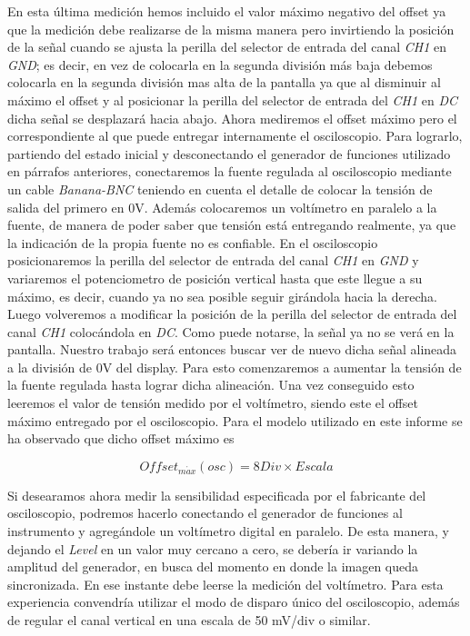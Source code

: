 \documentclass{article}
\begin{document}
\noindent En esta última medición hemos incluido el valor máximo negativo del offset ya que la medición debe realizarse de la misma manera pero invirtiendo la posición de la señal cuando se ajusta la perilla del selector de entrada del canal \textit{CH1} en \textit{GND}; es decir, en vez de colocarla en la segunda división más baja debemos colocarla en la segunda división mas alta de la pantalla ya que al disminuir al máximo el offset y al posicionar la perilla del selector de entrada del \textit{CH1} en \textit{DC} dicha señal se desplazará hacia abajo.
	\newpage
	Ahora mediremos el offset máximo pero el correspondiente al que puede entregar internamente el osciloscopio. Para lograrlo, partiendo del estado inicial y desconectando el generador de funciones utilizado en párrafos anteriores, conectaremos la fuente regulada al osciloscopio mediante un cable \textit{Banana-BNC} teniendo en cuenta el detalle de colocar la tensión de salida del primero en 0V. Además colocaremos un voltímetro en paralelo a la fuente, de manera de poder saber que tensión está entregando realmente, ya que la indicación de la propia fuente no es confiable. En el osciloscopio posicionaremos la perilla del selector de entrada del canal \textit{CH1} en \textit{GND} y variaremos el potenciometro de posición vertical hasta que este llegue a su máximo, es decir, cuando ya no sea posible seguir girándola hacia la derecha. Luego volveremos a modificar la posición de la perilla del selector de entrada del canal \textit{CH1} colocándola en \textit{DC}. Como puede notarse, la señal ya no se verá en la pantalla. Nuestro trabajo será entonces buscar ver de nuevo dicha señal alineada a la división de 0V del display. Para esto comenzaremos a aumentar la tensión de la fuente regulada hasta lograr dicha alineación. Una vez conseguido esto leeremos el valor de tensión medido por el voltímetro, siendo este el offset máximo entregado por el osciloscopio. Para el modelo utilizado en este informe se ha observado que dicho offset máximo es 

\begin{equation*}
	Offset_{m\acute{a}x}(osc) = 8 Div \times Escala
\end{equation*}
\medskip


	Si desearamos ahora medir la sensibilidad especificada por el fabricante del osciloscopio, podremos hacerlo conectando el generador de funciones al instrumento y agregándole un voltímetro digital en paralelo. De esta manera, y dejando el \textit{Level} en un valor muy cercano a cero, se debería ir variando la amplitud del generador, en busca del momento en donde la imagen queda sincronizada. En ese instante debe leerse la medición del voltímetro. Para esta experiencia convendría utilizar el modo de disparo único del osciloscopio, además de regular el canal vertical en una escala de 50 mV/div o similar.
\bigskip\bigskip\smallskip
\end{document}
